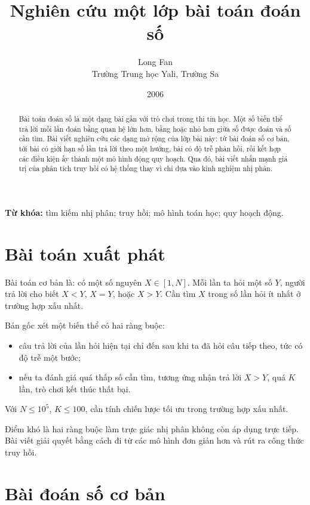 \documentclass[11pt]{article}
\title{Nghiên cứu một lớp bài toán đoán số}
\author{Long Fan\\Trường Trung học Yali, Trường Sa}
\date{2006}
\begin{document}
\maketitle


\renewcommand{\abstractname}{Tóm tắt}
\begin{abstract}
Bài toán đoán số là một dạng bài gần với trò chơi trong thi tin học. Một số
biến thể trả lời mỗi lần đoán bằng quan hệ lớn hơn, bằng hoặc nhỏ hơn giữa số
được đoán và số cần tìm. Bài viết nghiên cứu các dạng mở rộng của lớp bài này:
từ bài đoán số cơ bản, tới bài có giới hạn số lần trả lời theo một hướng, bài
có độ trễ phản hồi, rồi kết hợp các điều kiện ấy thành một mô hình động quy
hoạch. Qua đó, bài viết nhấn mạnh giá trị của phân tích truy hồi có hệ thống
thay vì chỉ dựa vào kinh nghiệm nhị phân.
\end{abstract}

\noindent\textbf{Từ khóa:} tìm kiếm nhị phân; truy hồi; mô hình toán học;
quy hoạch động.

\section{Bài toán xuất phát}

Bài toán cơ bản là: có một số nguyên \(X\in[1,N]\). Mỗi lần ta hỏi một số
\(Y\), người trả lời cho biết \(X<Y\), \(X=Y\), hoặc \(X>Y\). Cần tìm \(X\)
trong số lần hỏi ít nhất ở trường hợp xấu nhất.

Bản gốc xét một biến thể có hai ràng buộc:
\begin{itemize}
  \item câu trả lời của lần hỏi hiện tại chỉ đến sau khi ta đã hỏi câu tiếp
  theo, tức có độ trễ một bước;
  \item nếu ta đánh giá quá thấp số cần tìm, tương ứng nhận trả lời
  \(X>Y\), quá \(K\) lần, trò chơi kết thúc thất bại.
\end{itemize}
Với \(N\le 10^5\), \(K\le100\), cần tính chiến lược tối ưu trong trường hợp
xấu nhất.

Điểm khó là hai ràng buộc làm trực giác nhị phân không còn áp dụng trực tiếp.
Bài viết giải quyết bằng cách đi từ các mô hình đơn giản hơn và rút ra công
thức truy hồi.

\section{Bài đoán số cơ bản}
\end{document}

